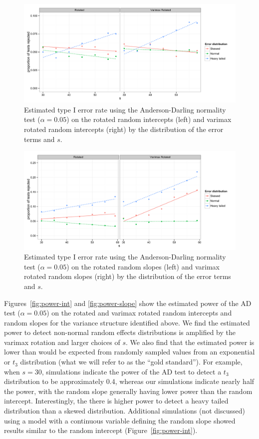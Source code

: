 \documentclass[12pt]{article} %
\begin{document}
\begin{figure}
	\centering
	\includegraphics[width=\textwidth]{ad_intercept_results.pdf}
	\caption{\label{fig:results-int} Estimated type I error rate using the Anderson-Darling normality test ($\alpha = 0.05$) on the rotated random intercepts (left) and varimax rotated random intercepts (right) by the distribution of the error terms and $s$. }
\end{figure}

\begin{figure}
	\centering
	\includegraphics[width=\textwidth]{ad_slope_results.pdf}
	\caption{\label{fig:results-slope} Estimated type I error rate using the Anderson-Darling normality test ($\alpha = 0.05$) on the rotated random slopes (left) and varimax rotated random slopes (right) by the distribution of the error terms and $s$.}
\end{figure}

Figures~\ref{fig:power-int} and \ref{fig:power-slope} show the estimated power of the AD test ($\alpha = 0.05$) on the rotated and varimax rotated random intercepts and random slopes for the variance structure identified above. We find the estimated power to detect non-normal random effects distributions is amplified by the varimax rotation and larger choices of $s$. We also find that the estimated power is lower than would be expected from randomly sampled values from an exponential or $t_3$ distribution (what we will refer to as the ``gold standard''). For example, when $s=30$, simulations indicate the power of the AD test to detect a $t_3$ distribution to be approximately 0.4, whereas our simulations indicate nearly half the power, with the random slope generally having lower power than the random intercept. Interestingly, the there is higher power to detect a heavy tailed distribution than a skewed distribution.  Additional simulations (not discussed) using a model with a continuous variable defining the random slope showed results similar to the random intercept (Figure~\ref{fig:power-int}).
\end{document}
